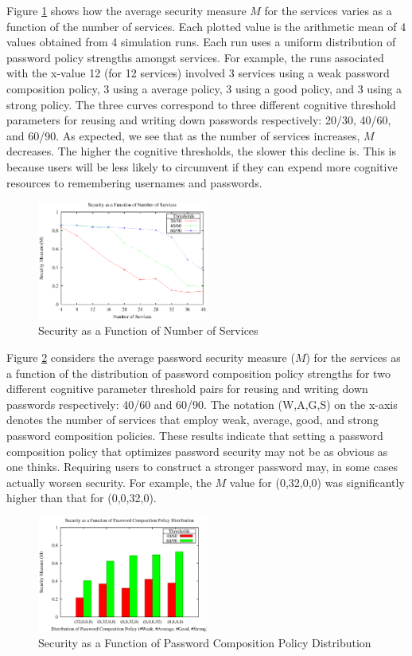 \documentclass[conference]{IEEEtran}
\begin{document}
{Figure \ref{fig:num_services} shows how the average security measure $M$ for the services varies as a function of the number of services. Each plotted value is the arithmetic mean of 4 values obtained from 4 simulation runs. Each run uses a uniform distribution of password policy strengths amongst services. For example, the runs associated with the x-value 12 (for 12 services) involved 3 services using a weak password composition policy, 3 using a average policy, 3 using a good policy, and 3 using a strong policy. The three curves correspond to three different cognitive threshold parameters for reusing and writing down passwords respectively:  20/30, 40/60, and 60/90. As expected, we see that as the number of services increases, $M$ decreases. The higher the cognitive thresholds, the slower this decline is. This is because users will be less likely to circumvent if they can expend more cognitive resources to remembering usernames and passwords.

\begin{figure}
  \centering
  \includegraphics[width=0.5\textwidth]{num_services.eps}    
  \caption{Security as a Function of Number of Services}
    \label{fig:num_services}
\end{figure}

Figure \ref{fig:password_comp} considers the average password security measure ($M$) for the services as a function of the distribution of password composition policy strengths for two different cognitive parameter threshold pairs for reusing and writing down passwords respectively: 40/60 and 60/90. The notation (W,A,G,S) on the x-axis denotes the number of services that employ weak, average, good, and strong password composition policies. These results indicate that setting a password composition policy that optimizes password security may not be as obvious as one thinks. Requiring users to construct a stronger password may, in some cases actually worsen security. For example, the $M$ value for (0,32,0,0) was significantly higher than that for (0,0,32,0).

\begin{figure}
  \centering
  \includegraphics[width=0.5\textwidth]{password_comp.eps}    
  \caption{Security as a Function of Password Composition Policy Distribution}
  \label{fig:password_comp}  
\end{figure}

}
\end{document}
